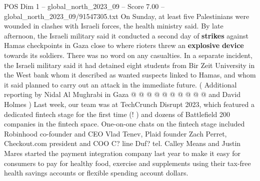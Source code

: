 \begin{textsample}{POS Dim 1 – global\_north\_2023\_09 – Score 7.00 – global\_north\_2023\_09/91547305.txt}
On Sunday, at least five Palestinians were wounded in clashes with Israeli forces, the health ministry said.
By late afternoon, the Israeli military said it conducted a second day of \textbf{strikes} against Hamas checkpoints in Gaza close to where rioters threw an \textbf{explosive} \textbf{device} towards its soldiers.
There was no word on any casualties.
In a separate incident, the Israeli military said it had detained eight students from Bir Zeit University in the West bank whom it described as wanted suspects linked to Hamas, and whom it said planned to carry out an attack in the immediate future. ( Additional reporting by Nidal Al Mughrabi in Gaza @ @ @ @ @ @ @ @ @ @ and David Holmes ) Last week, our team was at TechCrunch Disrupt 2023, which featured a dedicated fintech stage for the first time (! ) and dozens of Battlefield 200 companies in the fintech space.
One-on-one chats on the fintech stage included Robinhood co-founder and CEO Vlad Tenev, Plaid founder Zach Perret, Checkout.com president and COO C? line Duf? tel.
Calley Means and Justin Mares started the payment integration company last year to make it easy for consumers to pay for healthy food, exercise and supplements using their tax-free health savings accounts or flexible spending account dollars.

\end{textsample}

